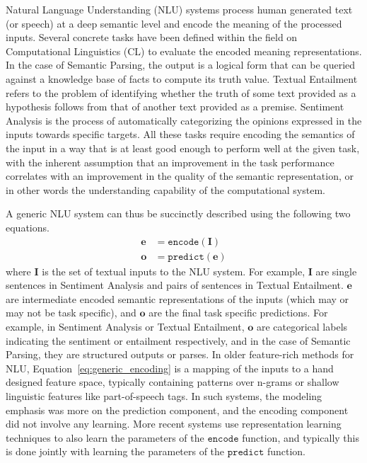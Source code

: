Natural Language Understanding (NLU) systems process human generated text (or speech) at a deep semantic level and encode the meaning
of the processed inputs. Several concrete tasks have been defined within the field on Computational Linguistics (CL) to evaluate the encoded meaning representations.
In the case of Semantic Parsing, the output is a logical form that can be queried against a knowledge base of facts to compute its truth value. Textual Entailment refers to the 
problem of identifying whether the truth of some text provided as a hypothesis follows from that of another text provided as a premise. Sentiment Analysis is the process of 
automatically categorizing the opinions expressed in the inputs towards specific targets. All these tasks require encoding the semantics of the input in a way that is
at least good enough to perform well at the given task, with the inherent assumption that an improvement in the task performance correlates with an improvement in the
quality of the semantic representation, or in other words the understanding capability of the computational system.

A generic NLU system can thus be succinctly described using the following two equations.
\begin{align}
 \mathbf{e} &= \mathtt{encode}(\mathbf{I}) \label{eq:generic_encoding}\\
 \mathbf{o} &= \mathtt{predict}(\mathbf{e}) \label{eq:generic_prediction}
\end{align}
where $\mathbf{I}$ is the set of textual inputs to the NLU system. For example, $\mathbf{I}$  are single sentences in Sentiment Analysis and pairs of sentences in Textual Entailment. $\textbf{e}$ are intermediate 
encoded semantic representations of the inputs (which may or may not be task specific), and $\mathbf{o}$ are the final task specific predictions. For example, in Sentiment Analysis or Textual Entailment, 
$\mathbf{o}$ are categorical labels indicating the sentiment or entailment respectively, and in the case of Semantic Parsing, they are structured outputs or parses. In older feature-rich methods for NLU, 
Equation~\ref{eq:generic_encoding} is a mapping of the inputs to a hand designed feature space, typically containing patterns over n-grams or shallow linguistic features like part-of-speech tags. In such systems,
the modeling emphasis was more on the prediction component, and the encoding component did not involve any learning. More recent systems use representation learning techniques to also learn the parameters of the
$\mathtt{encode}$ function, and typically this is done jointly with learning the parameters of the $\mathtt{predict}$ function.

